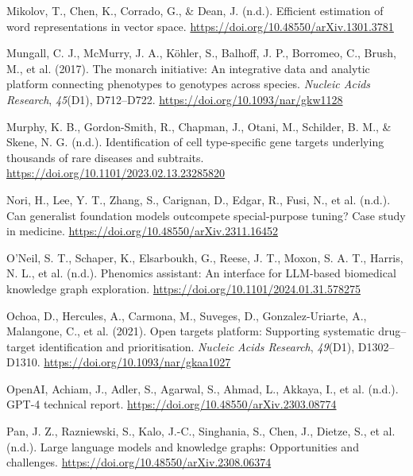 \documentclass[
]{agujournal2019}
\newlength{\cslhangindent}
\newenvironment{CSLReferences}[2] %
 {\begin{list}{}{%
  \setlength{\itemindent}{0pt}
  \setlength{\leftmargin}{0pt}
  \setlength{\parsep}{0pt}
  \ifodd #1
   \setlength{\leftmargin}{\cslhangindent}
   \setlength{\itemindent}{-1\cslhangindent}
  \fi
  \setlength{\itemsep}{#2\baselineskip}}}
 {\end{list}}
\begin{document}
\begin{CSLReferences}{1}{0}
Mikolov, T., Chen, K., Corrado, G., \& Dean, J. (n.d.). Efficient
estimation of word representations in vector space.
\url{https://doi.org/10.48550/arXiv.1301.3781}

Mungall, C. J., McMurry, J. A., Köhler, S., Balhoff, J. P., Borromeo,
C., Brush, M., et al. (2017). The monarch initiative: An integrative
data and analytic platform connecting phenotypes to genotypes across
species. \emph{Nucleic Acids Research}, \emph{45}(D1), D712--D722.
\url{https://doi.org/10.1093/nar/gkw1128}

Murphy, K. B., Gordon-Smith, R., Chapman, J., Otani, M., Schilder, B.
M., \& Skene, N. G. (n.d.). Identification of cell type-specific gene
targets underlying thousands of rare diseases and subtraits.
\url{https://doi.org/10.1101/2023.02.13.23285820}

Nori, H., Lee, Y. T., Zhang, S., Carignan, D., Edgar, R., Fusi, N., et
al. (n.d.). Can generalist foundation models outcompete special-purpose
tuning? Case study in medicine.
\url{https://doi.org/10.48550/arXiv.2311.16452}

O'Neil, S. T., Schaper, K., Elsarboukh, G., Reese, J. T., Moxon, S. A.
T., Harris, N. L., et al. (n.d.). Phenomics assistant: An interface for
LLM-based biomedical knowledge graph exploration.
\url{https://doi.org/10.1101/2024.01.31.578275}

Ochoa, D., Hercules, A., Carmona, M., Suveges, D., Gonzalez-Uriarte, A.,
Malangone, C., et al. (2021). Open targets platform: Supporting
systematic drug--target identification and prioritisation. \emph{Nucleic
Acids Research}, \emph{49}(D1), D1302--D1310.
\url{https://doi.org/10.1093/nar/gkaa1027}

OpenAI, Achiam, J., Adler, S., Agarwal, S., Ahmad, L., Akkaya, I., et
al. (n.d.). GPT-4 technical report.
\url{https://doi.org/10.48550/arXiv.2303.08774}

Pan, J. Z., Razniewski, S., Kalo, J.-C., Singhania, S., Chen, J.,
Dietze, S., et al. (n.d.). Large language models and knowledge graphs:
Opportunities and challenges.
\url{https://doi.org/10.48550/arXiv.2308.06374}


\end{CSLReferences}
\end{document}
